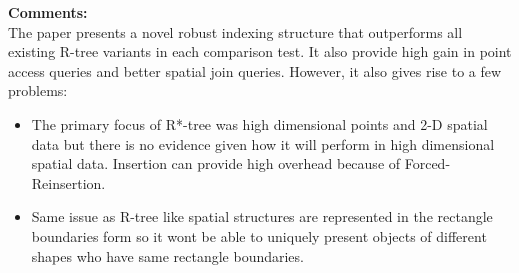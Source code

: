 \documentclass[a4paper,12pt, twoside]{article}
\begin{document}
\textbf{Comments:}\\
The paper presents a novel robust indexing structure that outperforms all existing R-tree variants in each comparison test. It also provide high gain in point access queries and better spatial join queries. However, it also gives rise to a few problems:
\begin{itemize}
	\item The primary focus of R*-tree was high dimensional points and 2-D spatial data but there is no evidence given how it will perform in high dimensional spatial data. Insertion can provide high overhead because of Forced-Reinsertion.
	\item Same issue as R-tree like spatial structures are represented in the rectangle boundaries form so it wont be able to uniquely present objects of different shapes who have same rectangle boundaries.
\end{itemize}
\end{document}
